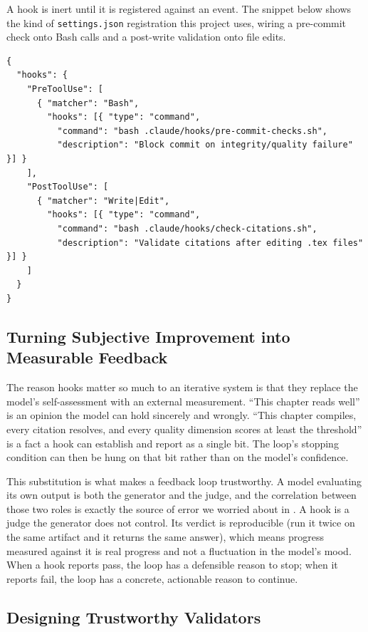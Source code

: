 A hook is inert until it is registered against an event. The snippet below shows the kind of \texttt{settings.json} registration this project uses, wiring a pre-commit check onto Bash calls and a post-write validation onto file edits.

\begin{verbatim}
{
  "hooks": {
    "PreToolUse": [
      { "matcher": "Bash",
        "hooks": [{ "type": "command",
          "command": "bash .claude/hooks/pre-commit-checks.sh",
          "description": "Block commit on integrity/quality failure" }] }
    ],
    "PostToolUse": [
      { "matcher": "Write|Edit",
        "hooks": [{ "type": "command",
          "command": "bash .claude/hooks/check-citations.sh",
          "description": "Validate citations after editing .tex files" }] }
    ]
  }
}
\end{verbatim}


\subsection{Turning Subjective Improvement into Measurable Feedback}\label{subsec:hooks-measurable}

The reason hooks matter so much to an iterative system is that they replace the model's self-assessment with an external measurement. ``This chapter reads well'' is an opinion the model can hold sincerely and wrongly. ``This chapter compiles, every citation resolves, and every quality dimension scores at least the threshold'' is a fact a hook can establish and report as a single bit. The loop's stopping condition can then be hung on that bit rather than on the model's confidence.

This substitution is what makes a feedback loop trustworthy. A model evaluating its own output is both the generator and the judge, and the correlation between those two roles is exactly the source of error we worried about in . A hook is a judge the generator does not control. Its verdict is reproducible (run it twice on the same artifact and it returns the same answer), which means progress measured against it is real progress and not a fluctuation in the model's mood. When a hook reports pass, the loop has a defensible reason to stop; when it reports fail, the loop has a concrete, actionable reason to continue.

\subsection{Designing Trustworthy Validators}\label{subsec:trustworthy-validators}

